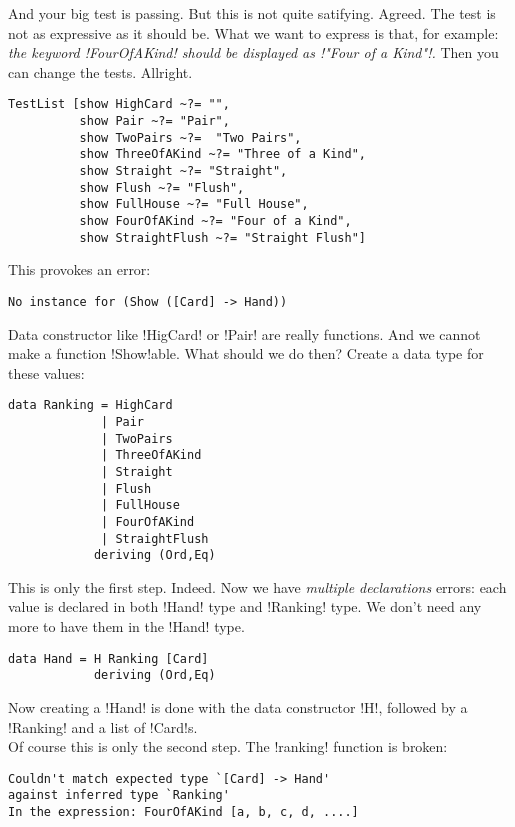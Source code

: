 \success And your big test is passing. But this is not quite satifying.
\lhN Agreed. The test is not as expressive as it should be. What we want to express is that, for example: \\
\emph{the keyword \il!FourOfAKind! should be displayed as \il!"Four of a Kind"!.}
\lhA Then you can change the tests.
\lhN Allright.
\begin{lstlisting}[frame=single]
 TestList [show HighCard ~?= "",
          show Pair ~?= "Pair",
          show TwoPairs ~?=  "Two Pairs",
          show ThreeOfAKind ~?= "Three of a Kind",
          show Straight ~?= "Straight",
          show Flush ~?= "Flush",
          show FullHouse ~?= "Full House",
          show FourOfAKind ~?= "Four of a Kind",
          show StraightFlush ~?= "Straight Flush"] 
\end{lstlisting}
\error This provokes an error:
\begin{small}
\begin{verbatim}
No instance for (Show ([Card] -> Hand))
\end{verbatim}
\end{small}
\lhA \error Data constructor like \il!HigCard! or \il!Pair! are really functions. And we cannot make a function \il!Show!able.
\lhN What should we do then?
\lhA Create a data type for these values:
\begin{lstlisting}[frame=single]
data Ranking = HighCard
             | Pair
             | TwoPairs
             | ThreeOfAKind
             | Straight
             | Flush
             | FullHouse
             | FourOfAKind
             | StraightFlush
            deriving (Ord,Eq)
\end{lstlisting}
\error This is only the first step.
\lhN Indeed. Now we have \emph{multiple declarations} errors: each value is declared in both \il!Hand! type and \il!Ranking! type.
\lhA We don't need any more to have them in the \il!Hand! type. 
\begin{lstlisting}[frame=single]
data Hand = H Ranking [Card]
            deriving (Ord,Eq)
\end{lstlisting}            
\error Now creating a \il!Hand! is done with the data constructor \il!H!, followed by a \il!Ranking! and a list of \il!Card!s. \\ Of course this is only the second step.
\lhN The \il!ranking! function is broken: \\
\begin{small}
\begin{verbatim}
Couldn't match expected type `[Card] -> Hand'
against inferred type `Ranking'
In the expression: FourOfAKind [a, b, c, d, ....]
\end{verbatim}
\end{small}
